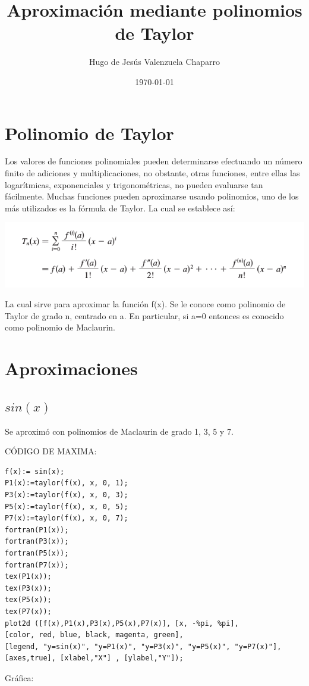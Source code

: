 \documentclass[notitlepage,12pt]{article}
\title{Aproximaci\'on mediante polinomios de Taylor}
\author{Hugo de Jes\'us Valenzuela Chaparro}
\date{\today}
\begin{document}
\maketitle

\section{Polinomio de Taylor}
Los valores de funciones polinomiales pueden determinarse efectuando un n\'umero finito de adiciones y multiplicaciones, no obstante,
otras funciones, entre ellas las logar\'itmicas, exponenciales y trigonom\'etricas, no pueden evaluarse tan f\'acilmente. Muchas
funciones pueden aproximarse usando polinomios, uno de los m\'as utilizados es la f\'ormula de Taylor. La cual se establece as\'i:

\includegraphics[scale=0.5]{ptaylor}

La cual sirve para aproximar la funci\'on f(x). Se le conoce como polinomio de Taylor de grado n, centrado en a. En particular, si a=0 
entonces es conocido como polinomio de Maclaurin.

\section{Aproximaciones}

\subsection{$sin(x)$}
Se aproxim\'o con polinomios de Maclaurin de grado 1, 3, 5 y 7.

C\'ODIGO DE MAXIMA:
\begin{verbatim}
f(x):= sin(x);
P1(x):=taylor(f(x), x, 0, 1);
P3(x):=taylor(f(x), x, 0, 3);
P5(x):=taylor(f(x), x, 0, 5);
P7(x):=taylor(f(x), x, 0, 7);
fortran(P1(x));
fortran(P3(x));
fortran(P5(x));
fortran(P7(x));
tex(P1(x));
tex(P3(x));
tex(P5(x));
tex(P7(x));
plot2d ([f(x),P1(x),P3(x),P5(x),P7(x)], [x, -%pi, %pi],
[color, red, blue, black, magenta, green],
[legend, "y=sin(x)", "y=P1(x)", "y=P3(x)", "y=P5(x)", "y=P7(x)"],
[axes,true], [xlabel,"X"] , [ylabel,"Y"]);
\end{verbatim}
Gr\'afica:
\end{document}
